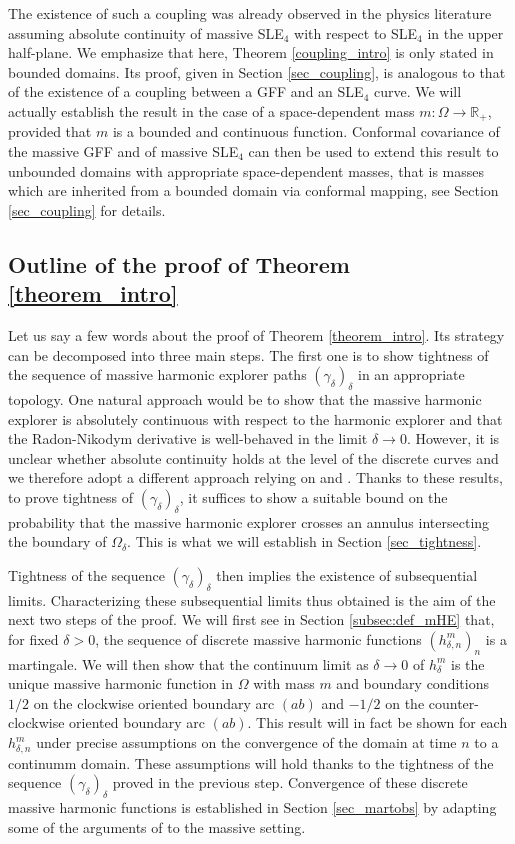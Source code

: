 \documentclass{article}
\theoremstyle{definition}
\theoremstyle{remark}
\theoremstyle{remark}
\begin{document}
The existence of such a coupling was already observed in the physics literature \cite{BBC} assuming absolute continuity of massive SLE$_4$ with respect to SLE$_4$ in the upper half-plane. We emphasize that here, Theorem \ref{coupling_intro} is only stated in bounded domains. Its proof, given in Section \ref{sec_coupling}, is analogous to that of the existence of a coupling between a GFF and an SLE$_4$ curve. We will actually establish the result in the case of a space-dependent mass $m: \Omega \to \mathbb{R}_{+}$, provided that $m$ is a bounded and continuous function. Conformal covariance of the massive GFF and of massive SLE$_4$ can then be used to extend this result to unbounded domains with appropriate space-dependent masses, that is masses which are inherited from a bounded domain via conformal mapping, see Section \ref{sec_coupling} for details.

\subsection{Outline of the proof of Theorem \ref{theorem_intro}}

Let us say a few words about the proof of Theorem \ref{theorem_intro}. Its strategy can be decomposed into three main steps. The first one is to show tightness of the sequence of massive harmonic explorer paths $(\gamma_{\delta})_{\delta}$ in an appropriate topology. One natural approach would be to show that the massive harmonic explorer is absolutely continuous with respect to the harmonic explorer and that the Radon-Nikodym derivative is well-behaved in the limit $\delta \to 0$. However, it is unclear whether absolute continuity holds at the level of the discrete curves and we therefore adopt a different approach relying on \cite{Smirnov} and \cite{Karrila}. Thanks to these results, to prove tightness of $(\gamma_{\delta})_{\delta}$, it suffices to show a suitable bound on the probability that the massive harmonic explorer crosses an annulus intersecting the boundary of $\Omega_{\delta}$. This is what we will establish in Section \ref{sec_tightness}.

Tightness of the sequence $(\gamma_{\delta})_{\delta}$ then implies the existence of subsequential limits. Characterizing these subsequential limits thus obtained is the aim of the next two steps of the proof. We will first see in Section \ref{subsec:def_mHE} that, for fixed $\delta >0$, the sequence of discrete massive harmonic functions $(h_{\delta, n}^m)_n$ is a martingale. We will then show that the continuum limit as $\delta \to 0$ of $h_{\delta}^{m}$ is the unique massive harmonic function in $\Omega$ with mass $m$ and boundary conditions $1/2$ on the clockwise oriented boundary arc $(ab)$ and $-1/2$ on the counter-clockwise oriented boundary arc $(ab)$. This result will in fact be shown for each $h_{\delta,n}^m$ under precise assumptions on the convergence of the domain at time $n$ to a continumm domain. These assumptions will hold thanks to the tightness of the sequence $(\gamma_{\delta})_{\delta}$ proved in the previous step. Convergence of these discrete massive harmonic functions is established in Section \ref{sec_martobs} by adapting some of the arguments of \cite{Discrete_analysis} to the massive setting. 
\end{document}
